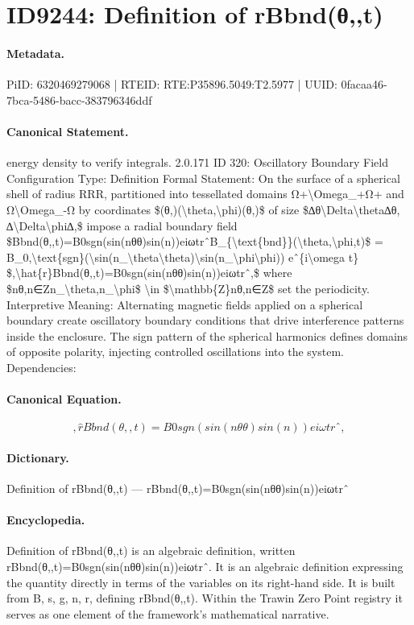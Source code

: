 \section*{ID9244: Definition of rBbnd(θ,,t)}
\paragraph{Metadata.}
PiID: 6320469279068 | RTEID: RTE:P35896.5049:T2.5977 | UUID: 0facaa46-7bca-5486-bacc-383796346ddf

\paragraph{Canonical Statement.}
energy density to verify integrals. 2.0.171 ID 320: Oscillatory Boundary Field Configuration Type: Definition Formal Statement: On the surface of a spherical shell of radius RRR, partitioned into tessellated domains Ω+\textbackslash{}Omega\_+Ω+ and Ω\textbackslash{}Omega\_-Ω by coordinates \$(θ,)(\textbackslash{}theta,\textbackslash{}phi)(θ,)\$ of size \$∆θ\textbackslash{}Delta\textbackslash{}theta∆θ, ∆\textbackslash{}Delta\textbackslash{}phi∆,\$ impose a radial boundary field \$Bbnd(θ,,t)=B0sgn(sin(nθθ)sin(n))eiωtrˆB\_\{\textbackslash{}text\{bnd\}\}(\textbackslash{}theta,\textbackslash{}phi,t)\$ = B\_0,\textbackslash{}text\{sgn\}(\textbackslash{}sin(n\_\textbackslash{}theta\textbackslash{}theta)\textbackslash{}sin(n\_\textbackslash{}phi\textbackslash{}phi)) eˆ\{i\textbackslash{}omega t\} \$,\textbackslash{}hat\{r\}Bbnd(θ,,t)=B0sgn(sin(nθθ)sin(n))eiωtrˆ,\$ where \$nθ,n∈Zn\_\textbackslash{}theta,n\_\textbackslash{}phi\$ \textbackslash{}in \$\textbackslash{}mathbb\{Z\}nθ,n∈Z\$ set the periodicity. Interpretive Meaning: Alternating magnetic fields applied on a spherical boundary create oscillatory boundary conditions that drive interference patterns inside the enclosure. The sign pattern of the spherical harmonics defines domains of opposite polarity, injecting controlled oscillations into the system. Dependencies:

\paragraph{Canonical Equation.}
\[
,\hat{r}Bbnd(θ,,t)=B0sgn(sin(nθθ)sin(n))eiωtrˆ,
\]

\paragraph{Dictionary.}
Definition of rBbnd(θ,,t) — rBbnd(θ,,t)=B0sgn(sin(nθθ)sin(n))eiωtrˆ

\paragraph{Encyclopedia.}
Definition of rBbnd(θ,,t) is an algebraic definition, written rBbnd(θ,,t)=B0sgn(sin(nθθ)sin(n))eiωtrˆ. It is an algebraic definition expressing the quantity directly in terms of the variables on its right-hand side. It is built from B, s, g, n, r, defining rBbnd(θ,,t). Within the Trawin Zero Point registry it serves as one element of the framework's mathematical narrative.
